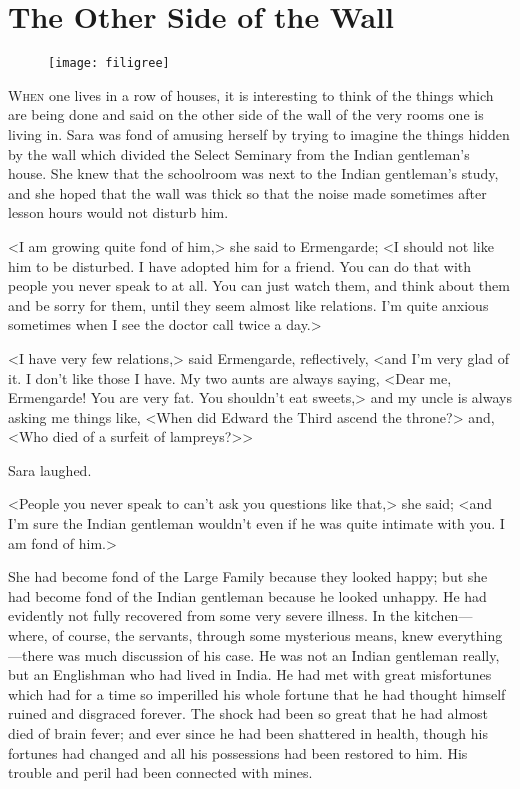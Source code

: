 \chapter{The Other Side of the Wall}

\begin{figure}[t!]
\centering
\texttt{[image: filigree]}
\end{figure}

\lettrine[lines=5]{W}{hen} one lives in a row of houses, it is interesting to think of the things which are being done and said on the other side of the wall of the very rooms one is living in. Sara was fond of amusing herself by trying to imagine the things hidden by the wall which divided the Select Seminary from the Indian gentleman's house. She knew that the schoolroom was next to the Indian gentleman's study, and she hoped that the wall was thick so that the noise made sometimes after lesson hours would not disturb him.

<I am growing quite fond of him,> she said to Ermengarde; <I should not like him to be disturbed. I have adopted him for a friend. You can do that with people you never speak to at all. You can just watch them, and think about them and be sorry for them, until they seem almost like relations. I'm quite anxious sometimes when I see the doctor call twice a day.>

<I have very few relations,> said Ermengarde, reflectively, <and I'm very glad of it. I don't like those I have. My two aunts are always saying, <Dear me, Ermengarde! You are very fat. You shouldn't eat sweets,> and my uncle is always asking me things like, <When did Edward the Third ascend the throne?> and, <Who died of a surfeit of lampreys?>>

Sara laughed.

<People you never speak to can't ask you questions like that,> she said; <and I'm sure the Indian gentleman wouldn't even if he was quite intimate with you. I am fond of him.>

She had become fond of the Large Family because they looked happy; but she had become fond of the Indian gentleman because he looked unhappy. He had evidently not fully recovered from some very severe illness. In the kitchen—where, of course, the servants, through some mysterious means, knew everything—there was much discussion of his case. He was not an Indian gentleman really, but an Englishman who had lived in India. He had met with great misfortunes which had for a time so imperilled his whole fortune that he had thought himself ruined and disgraced forever. The shock had been so great that he had almost died of brain fever; and ever since he had been shattered in health, though his fortunes had changed and all his possessions had been restored to him. His trouble and peril had been connected with mines.

